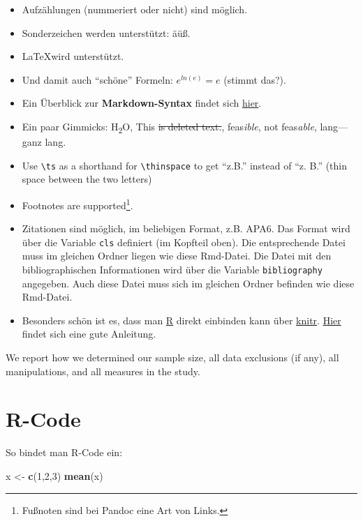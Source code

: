 \documentclass[11pt,a4paper,oneside]{article}
\newenvironment{Shaded}{\begin{snugshade}}{\end{snugshade}}
\newcommand{\DecValTok}[1]{\textcolor[rgb]{0.00,0.00,0.81}{#1}}
\newcommand{\KeywordTok}[1]{\textcolor[rgb]{0.13,0.29,0.53}{\textbf{#1}}}
\newcommand{\NormalTok}[1]{#1}
\newcommand{\StringTok}[1]{\textcolor[rgb]{0.31,0.60,0.02}{#1}}
\newcommand{\ts}{\thinspace}
\begin{document}
\begin{itemize}
\item
  Aufzählungen (nummeriert oder nicht) sind möglich.
\item
  Sonderzeichen werden unterstützt: äüß.
\item
  \LaTeX wird unterstützt.
\item
  Und damit auch \enquote{schöne} Formeln: \(e^{ln(e)}=e\) (stimmt
  das?).
\item
  Ein Überblick zur \textbf{Markdown-Syntax} findet sich
  \href{http://pandoc.org/README.html\#pandocs-markdown}{hier}.
\item
  Ein paar Gimmicks: H\textsubscript{2}O, This \sout{is deleted text.},
  feas\emph{ible}, not feas\emph{able}, lang---ganz lang.
\item
  Use \texttt{\textbackslash{}ts} as a shorthand for
  \texttt{\textbackslash{}thinspace} to get \enquote{z.\ts B.} instead
  of \enquote{z. B.} (thin space between the two letters)
\item
  Footnotes are supported\footnote{Fußnoten sind bei Pandoc eine Art von
    Links.}.
\item
  Zitationen sind möglich, im beliebigen Format, z.B. APA6. Das Format
  wird über die Variable \texttt{cls} definiert (im Kopfteil oben). Die
  entsprechende Datei muss im gleichen Ordner liegen wie diese
  Rmd-Datei. Die Datei mit den bibliographischen Informationen wird über
  die Variable \texttt{bibliography} angegeben. Auch diese Datei muss
  sich im gleichen Ordner befinden wie diese Rmd-Datei.
\item
  Besonders schön ist es, dass man \href{https://cran.r-project.org}{R}
  direkt einbinden kann über \href{http://yihui.name/knitr/}{knitr}.
  \href{http://galahad.well.ox.ac.uk/repro/}{Hier} findet sich eine gute
  Anleitung.
\end{itemize}

We report how we determined our sample size, all data exclusions (if
any), all manipulations, and all measures in the study.

\hypertarget{r-code}{%
\section{R-Code}\label{r-code}}

So bindet man R-Code ein:

\begin{Shaded}
\begin{Highlighting}[]
\NormalTok{x <-}\StringTok{ }\KeywordTok{c}\NormalTok{(}\DecValTok{1}\NormalTok{,}\DecValTok{2}\NormalTok{,}\DecValTok{3}\NormalTok{)}
\KeywordTok{mean}\NormalTok{(x)}
\end{Highlighting}
\end{Shaded}
\end{document}
